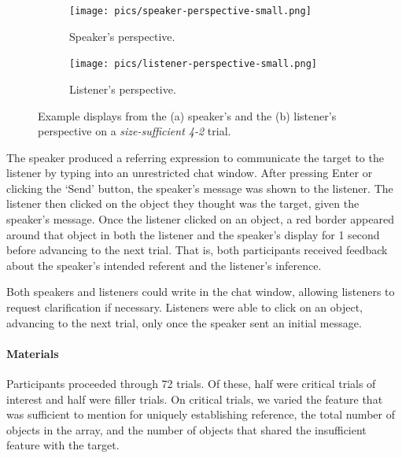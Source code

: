 \documentclass[11pt]{article}
\begin{document}
\begin{figure}
\begin{subfigure}{.5\textwidth}
\texttt{[image: pics/speaker-perspective-small.png]}
\caption{Speaker's perspective.}
\label{fig:speakerpersp}
\end{subfigure}
\begin{subfigure}{.5\textwidth}
\texttt{[image: pics/listener-perspective-small.png]}
\caption{Listener's perspective.}
\label{fig:listenerpersp}
\end{subfigure}
\caption{Example displays from the  (a) speaker's and the (b) listener's perspective on a \emph{size-sufficient 4-2} trial.}
\label{fig:speakerlistenerperspective}
\end{figure}

The speaker produced a referring expression to communicate the target to the listener by typing into an unrestricted chat window. After pressing Enter or clicking the `Send' button, the speaker's message was shown to the listener. The listener then clicked on the object they thought was the target, given the speaker's message.  Once the listener clicked on an object, a red border appeared around that object in both the listener and the speaker's display for 1 second before advancing to the next trial. That is, both participants received feedback about the speaker's intended referent and the listener's inference.

Both speakers and listeners could write in the chat window, allowing listeners to request clarification if necessary. Listeners were able to click on an object, advancing to the next trial, only once the speaker sent an initial message. 


\paragraph{Materials}

Participants proceeded through 72 trials. Of these, half were critical trials of interest and half were filler trials. On critical trials, we varied the feature that was sufficient to mention for uniquely establishing reference, the total number of objects in the array, and  the number of objects that shared the insufficient feature with the target. 
\end{document}

